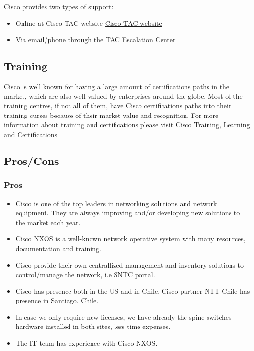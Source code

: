   Cisco provides two types of support:

  \begin{itemize}
    \item Online at Cisco TAC website \href{http://www.cisco.com/tac}{Cisco TAC website}
    \item Via email/phone through the TAC Escalation Center
  \end{itemize}

  \subsection{Training}

  Cisco is well known for having a large amount of certifications paths in the market, which are also well valued by enterprises around the globe. Most of the training centres, if not all of them, have Cisco certifications paths into their training curses because of their market value and recognition. For more information about training and certifications please visit \href{https://www.cisco.com/c/en/us/training-events/training-certifications.html}{Cisco Training, Learning and Certifications} 

\newpage

  \subsection{Pros/Cons}

  \subsubsection{Pros}
  \begin{itemize}
    \item Cisco is one of the top leaders in networking solutions and network equipment. They are always improving and/or developing new solutions to the market each year.
	\item Cisco NXOS is a well-known network operative system with many resources, documentation and training. 
	\item Cisco provide their own centrallized management and inventory solutions to control/manage the network, i.e SNTC portal. 
    \item Cisco has presence both in the US and in Chile. Cisco partner NTT Chile has presence in Santiago, Chile.
    \item In case we only require new licenses, we have already the spine switches hardware installed in both sites, less time expenses. 
    \item The IT team has experience with Cisco NXOS.
  \end{itemize}

